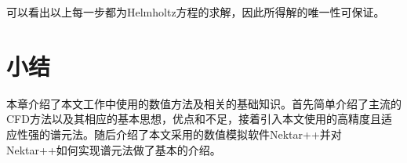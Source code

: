 可以看出以上每一步都为Helmholtz方程的求解，因此所得解的唯一性可保证。
%
%
%

\section{小结}
本章介绍了本文工作中使用的数值方法及相关的基础知识。首先简单介绍了主流的CFD方法以及其相应的基本思想，优点和不足，接着引入本文使用的高精度且适应性强的谱元法。随后介绍了本文采用的数值模拟软件Nektar++并对Nektar++如何实现谱元法做了基本的介绍。

